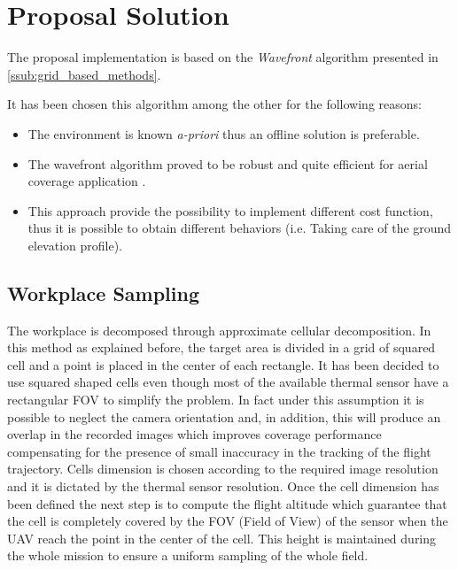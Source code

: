 
\section{Proposal Solution} %
\label{sec:proposal_solution}
The proposal implementation is based on the \textit{Wavefront} algorithm presented in \autoref{ssub:grid_based_methods}.

It has been chosen this algorithm among the other for the following reasons:
\begin{itemize}
	\item The environment is known \textit{a-priori} thus an offline solution is preferable.
	\item The wavefront algorithm proved to be robust and quite efficient for aerial coverage application \cite{7496385}.
	\item This approach provide the possibility to implement different cost function, thus it is possible to obtain different behaviors (i.e. Taking care of the ground elevation profile).
\end{itemize}
\subsection{Workplace Sampling} %
\label{sub:workplace_sampling}
The workplace is decomposed through approximate cellular decomposition. In this method as explained before, the target area is divided in a grid of squared cell and a point is placed in the center of each rectangle. It has been decided to use squared shaped cells even though most of the available thermal sensor have a rectangular FOV to simplify the problem. In fact under this assumption it is possible to neglect the camera orientation and, in addition, this will produce an overlap in the recorded images which improves coverage performance compensating for the presence of small inaccuracy in the tracking of the flight trajectory. Cells dimension is chosen according to the required image resolution and it is dictated by the thermal sensor resolution. Once the cell dimension has been defined the next step is to compute the flight altitude which guarantee that the cell is completely covered by the FOV (Field of View) of the sensor when the UAV reach the point in the center of the cell. This height is maintained during the whole mission to ensure a uniform sampling of the whole field. \par

